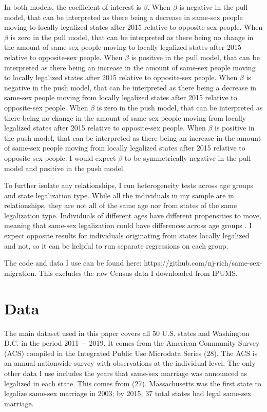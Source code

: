 \documentclass[12pt,letterpaper]{article}
\begin{document}
In both models, the coefficient of interest is $\beta$. When $\beta$ is negative in the pull model, that can be interpreted as there being a decrease in same-sex people moving to locally legalized states after 2015 relative to opposite-sex people. When $\beta$ is zero in the pull model, that can be interpreted as there being no change in the amount of same-sex people moving to locally legalized states after 2015 relative to opposite-sex people. When $\beta$ is positive in the pull model, that can be interpreted as there being an increase in the amount of same-sex people moving to locally legalized states after 2015 relative to opposite-sex people. When $\beta$ is negative in the push model, that can be interpreted as there being a decrease in same-sex people moving from locally legalized states after 2015 relative to opposite-sex people. When $\beta$ is zero in the push model, that can be interpreted as there being no change in the amount of same-sex people moving from locally legalized states after 2015 relative to opposite-sex people. When $\beta$ is positive in the push model, that can be interpreted as there being an increase in the amount of same-sex people moving from locally legalized states after 2015 relative to opposite-sex people. I would expect $\beta$ to be symmetrically negative in the pull model and positive in the push model.

To further isolate any relationships, I run heterogeneity tests across age groups and state legalization type. While all the individuals in my sample are in relationships, they are not all of the same age nor from states of the same legalization type. Individuals of different ages have different propensities to move, meaning that same-sex legalization could have differences across age groups \citep{1, 17}.  I expect opposite results for individuals originating from states locally legalized and not, so it can be helpful to run separate regressions on each group.

The code and data I use can be found here: https://github.com/nj-rich/same-sex-migration. This excludes the raw Census data I downloaded from IPUMS.

\section{Data}

The main dataset used in this paper covers all 50 U.S. states and Washington D.C. in the period 2011 − 2019. It comes from the American Community Survey (ACS) compiled in the Integrated Public Use Microdata Series (28). The ACS is an annual nationwide survey with observations at the individual level. The only other data I use includes the years that same-sex marriage was announced as legalized in each state. This comes from (27). Massachusetts was the first state to legalize same-sex marriage in 2003; by 2015, 37 total states had legal same-sex marriage.
\end{document}
